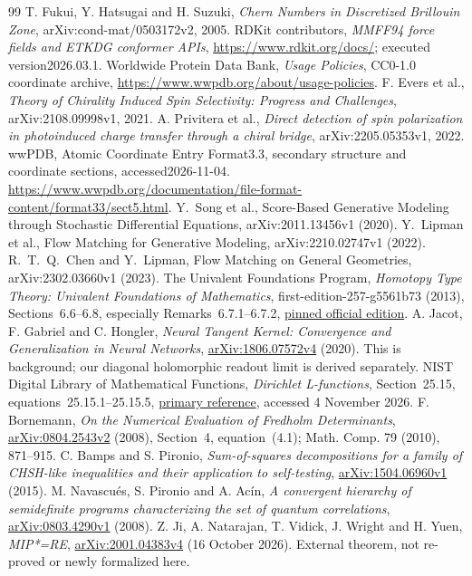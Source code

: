 \begin{thebibliography}{99}
 T. Fukui, Y. Hatsugai and H. Suzuki,
\emph{Chern Numbers in Discretized Brillouin Zone},
arXiv:cond-mat/0503172v2, 2005.
 RDKit contributors,
\emph{MMFF94 force fields and ETKDG conformer APIs},
\url{https://www.rdkit.org/docs/}; executed version2026.03.1.
 Worldwide Protein Data Bank,
\emph{Usage Policies}, CC0-1.0 coordinate archive,
\url{https://www.wwpdb.org/about/usage-policies}.
 F. Evers et al.,
\emph{Theory of Chirality Induced Spin Selectivity: Progress and Challenges},
arXiv:2108.09998v1, 2021.
 A. Privitera et al.,
\emph{Direct detection of spin polarization in photoinduced charge transfer
through a chiral bridge}, arXiv:2205.05353v1, 2022.
 wwPDB, Atomic Coordinate Entry Format3.3, secondary structure and coordinate sections, accessed2026-11-04. \url{https://www.wwpdb.org/documentation/file-format-content/format33/sect5.html}.
 Y.~Song et al., Score-Based Generative Modeling through Stochastic Differential Equations, arXiv:2011.13456v1 (2020).
 Y.~Lipman et al., Flow Matching for Generative Modeling, arXiv:2210.02747v1 (2022).
 R.~T.~Q.~Chen and Y.~Lipman, Flow Matching on General Geometries, arXiv:2302.03660v1 (2023).
 The Univalent Foundations Program, \emph{Homotopy Type Theory: Univalent Foundations of Mathematics}, first-edition-257-g5561b73 (2013), Sections~6.6--6.8, especially Remarks~6.7.1--6.7.2, \href{https://homotopytypetheory.org/wp-content/uploads/2013/03/hott-online-257-g5561b73.pdf}{pinned official edition}.
 A. Jacot, F. Gabriel and C. Hongler, \emph{Neural Tangent Kernel: Convergence and Generalization in Neural Networks}, \href{https://arxiv.org/abs/1806.07572v4}{arXiv:1806.07572v4} (2020). This is background; our diagonal holomorphic readout limit is derived separately.
 NIST Digital Library of Mathematical Functions, \emph{Dirichlet L-functions}, Section~25.15, equations~25.15.1--25.15.5, \href{https://dlmf.nist.gov/25.15}{primary reference}, accessed 4 November 2026.
 F. Bornemann, \emph{On the Numerical Evaluation of Fredholm Determinants}, \href{https://arxiv.org/abs/0804.2543v2}{arXiv:0804.2543v2} (2008), Section~4, equation~(4.1); Math. Comp. 79 (2010), 871--915.
 C. Bamps and S. Pironio, \emph{Sum-of-squares decompositions for a family of CHSH-like inequalities and their application to self-testing}, \href{https://arxiv.org/abs/1504.06960v1}{arXiv:1504.06960v1} (2015).
 M. Navascu\'es, S. Pironio and A. Ac\'in, \emph{A convergent hierarchy of semidefinite programs characterizing the set of quantum correlations}, \href{https://arxiv.org/abs/0803.4290v1}{arXiv:0803.4290v1} (2008).
 Z. Ji, A. Natarajan, T. Vidick, J. Wright and H. Yuen, \emph{MIP*=RE}, \href{https://arxiv.org/abs/2001.04383v4}{arXiv:2001.04383v4} (16 October 2026). External theorem, not re-proved or newly formalized here.
\end{thebibliography}
